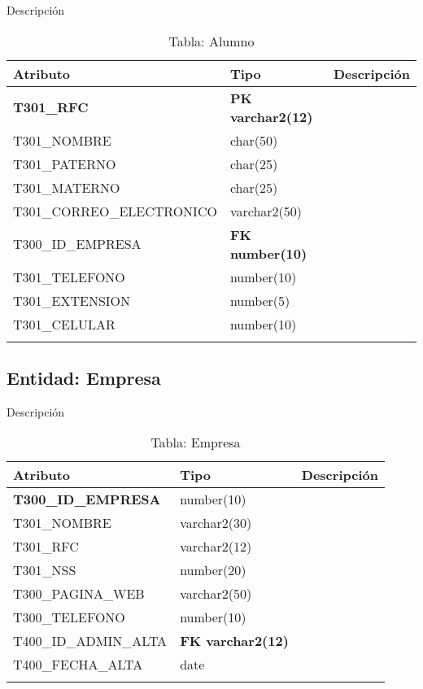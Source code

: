 Descripción
\begin{longtable}{| p{} | p{} | p{} |}
    \hline
        Atributo & Tipo & Descripción\\
    \hline
    \endhead
    \hline
    \bf{T301\_RFC}&   \bf PK  varchar2(12)&\\
    \hline
    T301\_NOMBRE&  char(50)&\\
    \hline
    T301\_PATERNO&  char(25)&\\
    \hline
    T301\_MATERNO&  char(25)&\\
    \hline
    T301\_CORREO\_ELECTRONICO&  varchar2(50)&\\
    \hline
    T300\_ID\_EMPRESA&  \bf{FK} number(10)&\\
    \hline
    T301\_TELEFONO&  number(10)&\\
    \hline
    T301\_EXTENSION&  number(5)&\\
    \hline
    T301\_CELULAR&  number(10)&\\
    \hline
    \caption{Tabla: Alumno}
\end{longtable}
\subsection{Entidad: Empresa}

Descripción
\begin{longtable}{| p{} | p{} | p{} |}
    \hline
        Atributo & Tipo & Descripción\\
    \hline
    \endhead
    \hline
    \bf{T300\_ID\_EMPRESA}& number(10)&\\
    \hline
    T301\_NOMBRE& varchar2(30)&\\
    \hline
    T301\_RFC& varchar2(12)&\\
    \hline
    T301\_NSS& number(20)&\\
    \hline
    T300\_PAGINA\_WEB& varchar2(50)&\\
    \hline
    T300\_TELEFONO& number(10)&\\
    \hline
    T400\_ID\_ADMIN\_ALTA& \bf{FK} varchar2(12)&\\
    \hline
    T400\_FECHA\_ALTA& date&\\
    \hline
    \caption{Tabla: Empresa}
\end{longtable}
